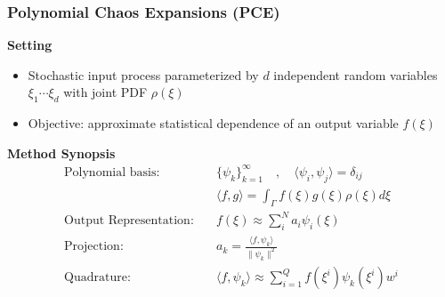 \documentclass[9pt]{beamer}
\newcommand{\beqq}[0]{\begin{equation*}}
\newcommand{\eeqq}[0]{\end{equation*}}
\begin{document}
\begin{frame}
\frametitle{Polynomial Chaos Expansions (PCE)}
\label{sec-4-13}

\textbf{Setting}
\begin{itemize}
\item Stochastic input process parameterized by $d$ independent random
  variables $\xi_1 \cdots \xi_d$ with joint PDF $\rho(\xi)$
\item Objective: approximate statistical dependence of an output variable $f(\xi)$
\end{itemize}
\textbf{Method Synopsis}
\beqq
\begin{aligned}
\text{Polynomial basis:} \quad & \lbrace \psi_k \rbrace_{k=1}^{\infty} \quad , \quad \langle \psi_i , \psi_j \rangle = \delta_{ij} \\
&\langle f , g \rangle = \int_{\Gamma} f(\xi) g(\xi) \rho(\xi) d\xi \\
\text{Output Representation:} \quad & f(\xi) \approx \sum_{i}^N a_i \psi_i(\xi) \\
\text{Projection:} \quad & a_k = \frac{\langle f,\psi_k \rangle}{\| \psi_k \|^2} \\
\text{Quadrature:} \quad & \langle f,\psi_k \rangle \approx \sum_{i=1}^Q f(\xi^i) \psi_k(\xi^i) w^i \\
\end{aligned}
\eeqq
\end{frame}
\end{document}
